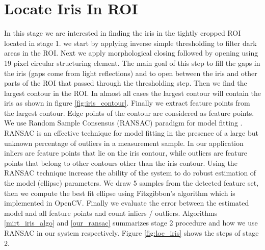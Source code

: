 \section{Locate Iris In ROI} 
In this stage we are interested in finding the iris in the tightly cropped ROI located in stage 1. we start by applying inverse simple thresholding to filter dark areas in the ROI. Next we apply morphological closing followed by opening using 19 pixel circular structuring element. The main goal of this step to fill the gaps in the iris (gaps come from light reflections) and to open between the iris and other parts of the ROI that passed through the thresholding step. Then we find the largest contour in the ROI. In almost all cases the largest contour will contain the iris as shown in figure \ref{fig:iris_contour}. Finally we extract feature points from the largest contour. Edge points of the contour are considered as feature points. We use Random Sample Consensus (RANSAC) paradigm for model fitting \cite{ransac}. RANSAC is an effective technique for model fitting in the presence of a large but unknown percentage of outliers in a measurement sample. In our application inliers are feature points that lie on the iris contour, while outliers are feature points that belong to other contours other than the iris contour. Using the RANSAC technique increase the ability of the system to do robust estimation of the model (ellipse) parameters. We draw 5 samples from the detected feature set, then we compute the best fit ellipse using Fitzgibbon’s algorithm \cite{fitzgibbon96} which is implemented in OpenCV. Finally we evaluate the error between the estimated model and all feature points and count inliers / outliers. Algorithms \ref{mirt_iris_algo} and \ref{our_ransac} summarizes stage 2 procedure and how we use RANSAC in our system respectively. Figure \ref{fig:loc_iris} shows the steps of stage 2. 


